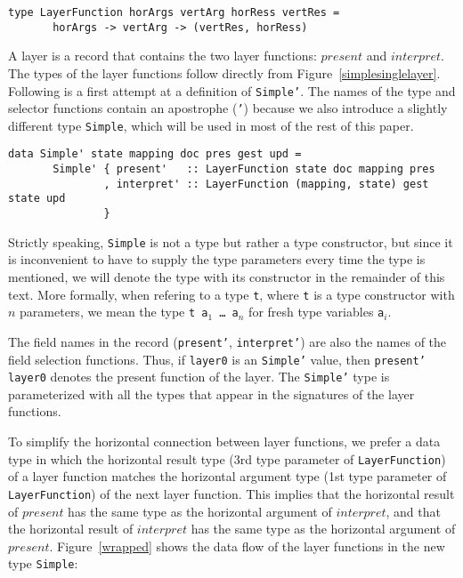 \begin{small}
\begin{verbatim}
type LayerFunction horArgs vertArg horRess vertRes =
       horArgs -> vertArg -> (vertRes, horRess)
\end{verbatim}
\end{small}

A layer is a record that contains the two layer functions: $present$ and $interpret$. The types of the layer functions follow directly from Figure~\ref{simplesinglelayer}. Following is a first attempt at a definition of \texttt{Simple'}. The names of the type and selector functions contain an apostrophe (\texttt{'}) because we also introduce a slightly different type \texttt{Simple}, which will be used in most of the rest of this paper. 

\begin{small}
\begin{verbatim}
data Simple' state mapping doc pres gest upd =
       Simple' { present'   :: LayerFunction state doc mapping pres
               , interpret' :: LayerFunction (mapping, state) gest state upd
               }
\end{verbatim}
\end{small}

Strictly speaking, \texttt{Simple} is not a type but rather a type constructor, but since it is inconvenient to have to supply the type parameters every time the type is mentioned, we will denote the type with its constructor in the remainder of this text. More formally, when refering to a type \texttt{t}, where \texttt{t} is a type constructor with $n$ parameters, we mean the type \texttt{t a$_1$ \dots ~a$_n$} for fresh type variables \texttt{a$_i$}.

The field names in the record (\texttt{present'}, \texttt{interpret'}) are also the names of the field selection functions. Thus, if \texttt{layer0} is an \texttt{Simple'} value, then \texttt{present' layer0} denotes the present function of the layer. The \texttt{Simple'} type is parameterized with all the types that appear in the signatures of the layer functions.

To simplify the horizontal connection between layer functions, we prefer a data type in which the horizontal result type (3rd type parameter of \texttt{LayerFunction}) of a layer function matches the horizontal argument type (1st type parameter of \texttt{LayerFunction}) of the next layer function. This implies that the horizontal result of $present$ has the same type as the horizontal argument of $interpret$, and that the horizontal result of $interpret$ has the same type as the horizontal argument of $present$. Figure~\ref{wrapped} shows the data flow of the layer functions in the new type \texttt{Simple}:

